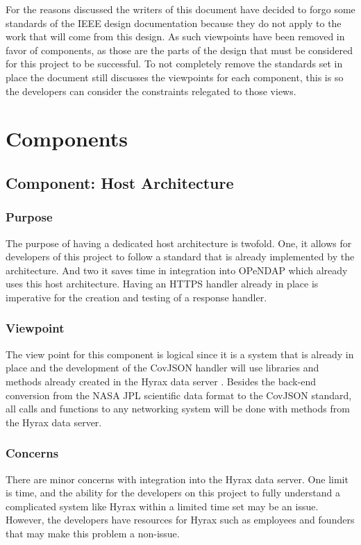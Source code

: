 \documentclass[onecolumn, draftclsnofoot,10pt, compsoc]{IEEEtran}
\begin{document}
For the reasons discussed the writers of this document have decided to forgo some standards of the IEEE design documentation because they do not apply to the work that will come from this design. As such viewpoints have been removed in favor of components, as those are the parts of the design that must be considered for this project to be successful. To not completely remove the standards set in place the document still discusses the viewpoints for each component, this is so the developers can consider the constraints relegated to those views. 

\section{Components}

\subsection{Component: Host Architecture}
\subsubsection{Purpose}
The purpose of having a dedicated host architecture is twofold. One, it allows for developers of this project to follow a standard that is already implemented by the architecture. And two it saves time in integration into OPeNDAP which already uses this host architecture. Having an HTTPS handler already in place is imperative for the creation and testing of a response handler. 
\subsubsection{Viewpoint}
The view point for this component is logical since it is a system that is already in place and the development of the CovJSON handler will use libraries and methods already created in the \gls{Hyrax} data server \cite{IEEE}. Besides the back-end conversion from the NASA JPL scientific data format to the CovJSON standard, all calls and functions to any networking system will be done with methods from the Hyrax data server.
\subsubsection{Concerns}
There are minor concerns with integration into the Hyrax data server. One limit is time, and the ability for the developers on this project to fully understand a complicated system like Hyrax within a limited time set may be an issue. However, the developers have resources for Hyrax such as employees and founders that may make this problem a non-issue. 
\end{document}
